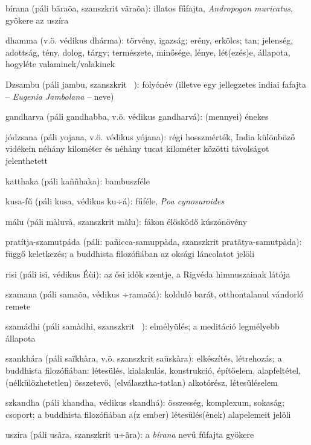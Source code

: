 
bírana (páli bãraõa, szanszkrit vãraõa): illatos fűfajta, \textit{Andropogon muricatus}, gyökere az uszíra

dhamma (v.ö. védikus dhárma): törvény, igazság; erény, erkölcs; tan; jelenség, adottság, tény, dolog, tárgy; természete, minősége, lénye, lét(ezés)e, állapota, hogyléte valaminek/valakinek

Dzsambu (páli jambu, szanszkrit ~): folyónév (illetve egy jellegzetes indiai fafajta – \textit{Eugenia Jambolana} – neve) 

gandharva (páli gandhabba, v.ö. védikus gandharvá): (mennyei) énekes

jódzsana (páli yojana, v.ö. védikus yójana): régi hosszmérték, India különböző vidékein néhány kilométer és néhány tucat kilométer közötti távolságot jelenthetett

katthaka (páli kaññhaka): bambuszféle

kusa-fű (páli kusa, védikus ku÷á): fűféle, \textit{Poa cynosuroides}

málu (páli màluvà, szanszkrit màlu): fákon élősködő kúszónövény

pratítja-szamutpáda (páli: pañicca-samuppàda, szanszkrit pratãtya-samutpàda): függő keletkezés; a buddhista filozófiában az oksági láncolatot jelöli

risi (páli isi, védikus\textit{ }Éùi): az ősi idők szentje, a Rigvéda himnuszainak látója

szamana (páli samaõa, védikus\textit{ }÷ramaõá): kolduló barát, otthontalanul vándorló remete

szamádhi (páli samàdhi, szanszkrit ~): elmélyülés; a meditáció legmélyebb állapota



szankhára (páli saïkhàra, v.ö. szanszkrit saüskàra): elkészítés, létrehozás; a buddhista filozófiában: létesülés, kialakulás, konstrukció, építőelem, alapfeltétel, (nélkülözhetetlen) összetevő, (elválasztha-tatlan) alkotórész, létesüléselem

szkandha (páli khandha, védikus skandhá): összesség, komplexum, sokaság; csoport; a buddhista filozófiában a(z ember) létesülés(ének) alapelemeit jelöli

uszíra (páli usãra, szanszkrit u÷ãra): a \textit{bírana} nevű fűfajta gyökere
